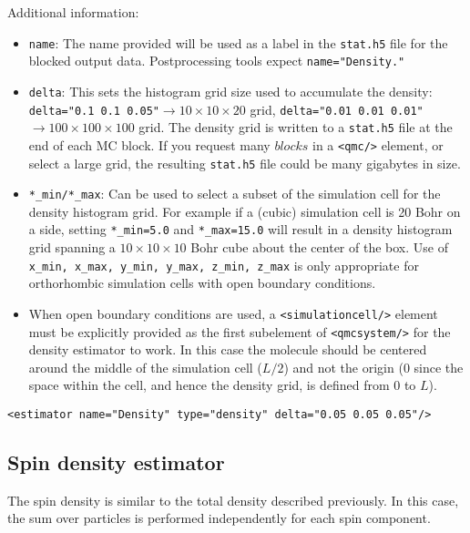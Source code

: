 Additional information:
\begin{itemize}
  \item{\texttt{name}: The name provided will be used as a label in the \texttt{stat.h5} file for the blocked output data.  Postprocessing tools expect \texttt{name="Density."}}
  \item{\texttt{delta}:  This sets the histogram grid size used to accumulate the density: \texttt{delta="0.1 0.1 0.05"}$\rightarrow 10\times 10\times 20$ grid, \texttt{delta="0.01 0.01 0.01"}$\rightarrow 100\times 100\times 100$ grid.  The density grid is written to a \texttt{stat.h5} file at the end of each MC block.  If you request many $blocks$ in a \texttt{<qmc/>} element, or select a large grid, the resulting \texttt{stat.h5} file could be many gigabytes in size.}
  \item{\texttt{*\_min/*\_max}: Can be used to select a subset of the simulation cell for the density histogram grid.  For example if a (cubic) simulation cell is 20 Bohr on a side, setting \texttt{*\_min=5.0} and \texttt{*\_max=15.0} will result in a density histogram grid spanning a $10\times 10\times 10$ Bohr cube about the center of the box.  Use of \texttt{x\_min, x\_max, y\_min, y\_max, z\_min, z\_max} is only appropriate for orthorhombic simulation cells with open boundary conditions.}
  \item{When open boundary conditions are used, a \texttt{<simulationcell/>} element must be explicitly provided as the first subelement of \texttt{<qmcsystem/>} for the density estimator to work.  In this case the molecule should be centered around the middle of the simulation cell ($L/2$) and not the origin ($0$} since the space within the cell, and hence the density grid, is defined from $0$ to $L$).
\end{itemize}


\begin{lstlisting}[style=QMCPXML,caption=Density estimator (uniform grid).]
   <estimator name="Density" type="density" delta="0.05 0.05 0.05"/>
\end{lstlisting}

\subsection{Spin density estimator}

The spin density is similar to the total density described previously.  In this case, the sum over particles is performed independently for each spin component.

